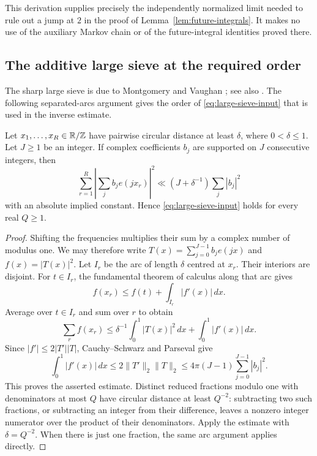 This derivation supplies precisely the independently normalized limit
needed to rule out a jump at $2$ in the proof of
Lemma~\ref{lem:future-integrals}.  It makes no use of the auxiliary
Markov chain or of the future-integral identities proved there.

\subsection{The additive large sieve at the required order}

The sharp large sieve is due to Montgomery and Vaughan
\cite{MontgomeryVaughan1973}; see also \cite{VaughanLargeSieve}.
The following separated-arcs argument gives the order of
\eqref{eq:large-sieve-input} that is used in the inverse estimate.

\begin{lemma}\label{lem:elementary-large-sieve}
Let $x_1,\ldots,x_R\in\mathbb R/\mathbb Z$ have pairwise circular distance at least
$\delta$, where $0<\delta\le1$.  Let $J\ge1$ be an integer.  If complex
coefficients $b_j$ are supported on $J$ consecutive integers, then
\[
 \sum_{r=1}^{R}\left|\sum_j b_j e(jx_r)\right|^2
   \ll (J+\delta^{-1})\sum_j|b_j|^2
\]
with an absolute implied constant.  Hence
\eqref{eq:large-sieve-input} holds for every real $Q\ge1$.
\end{lemma}

\begin{proof}
Shifting the frequencies multiplies their sum by a complex number of
modulus one.  We may therefore write
$T(x)=\sum_{j=0}^{J-1}b_j e(jx)$ and $f(x)=|T(x)|^2$.
Let $I_r$ be the arc of length $\delta$ centred at $x_r$.
Their interiors are disjoint.  For $t\in I_r$, the fundamental theorem
of calculus along that arc gives
\[
 f(x_r)\le f(t)+\int_{I_r}|f'(x)|\,dx.
\]
Average over $t\in I_r$ and sum over $r$ to obtain
\[
 \sum_r f(x_r)
 \le\delta^{-1}\int_0^1|T(x)|^2\,dx
       +\int_0^1|f'(x)|\,dx.
\]
Since $|f'|\le2|T'||T|$, Cauchy--Schwarz and Parseval give
\[
 \int_0^1|f'(x)|\,dx
 \le2\|T'\|_2\|T\|_2
 \le4\pi(J-1)\sum_{j=0}^{J-1}|b_j|^2.
\]
This proves the asserted estimate.  Distinct reduced fractions modulo
one with denominators at most $Q$ have circular distance at least
$Q^{-2}$: subtracting two such fractions, or subtracting an integer
from their difference, leaves a nonzero integer numerator over the
product of their denominators.  Apply the estimate with
$\delta=Q^{-2}$.  When there is just one fraction, the same arc
argument applies directly.
\end{proof}

